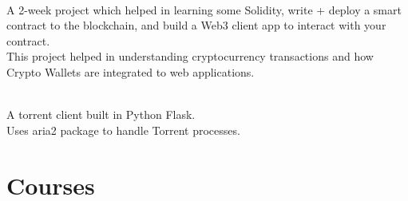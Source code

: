 \documentclass[]{resume}
\begin{document}
\begin{minipage}[t]{0.60\textwidth}
 \\
\textbullet{} A 2-week project which helped in learning some Solidity, write + deploy a smart contract to the blockchain, and build a Web3 client app to interact with your contract. \\
\textbullet{} This project helped in understanding cryptocurrency transactions and how Crypto Wallets are integrated to web applications.\\ 
\bigskip

 \\
\textbullet{} A torrent client built in Python Flask.\\
\textbullet{} Uses aria2 package to handle Torrent processes.\\ 
\bigskip
\bigskip


\section{Courses}
\\
\sectionsep

\medskip




%
%

\end{minipage}
\hfill
\end{document}
